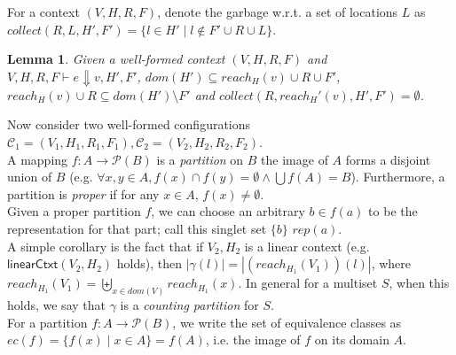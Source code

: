 \documentclass{easychair}
\newcommand{\na}[1]{\mathsf{linearCtxt}(#1)}
\newtheorem{lemma}[theorem]{Lemma}
\theoremstyle{definition}
\begin{document}
For a context $(V,H,R,F)$, denote the
garbage w.r.t. a set of locations $L$ 
as $collect(R,L,H',F') = \{l \in H' \mid l \notin F' \cup R \cup L\}$.
\begin{lemma}\label{itm:eager}
	Given a well-formed context $(V,H,R,F)$ and $V,H,R,F \vdash e \Downarrow v,H',F'$, 
	$dom(H') \subseteq reach_H(v) \cup R \cup F'$,
	$reach_H(v) \cup R \subseteq dom(H') \setminus F'$ and
	$collect(R,reach_H'(v),H',F') = \emptyset$.
\end{lemma}

Now consider two well-formed configurations $\mathcal{C}_1 = (V_1,H_1,R_1,F_1),
 \mathcal{C}_2 = (V_2,H_2,R_2,F_2)$.\\

A mapping $f : A \to \mathcal{P}(B)$ is a \emph{partition} on $B$ the image of 
$A$ forms a disjoint union of $B$ 
(e.g. $\forall x,y \in A, f(x) \cap f(y) = \emptyset \land \bigcup f(A) = B$). Furthermore,
a partition is \emph{proper} if for any $x \in A$, $f(x) \neq \emptyset$.\\
Given a proper partition $f$, we can choose an arbitrary 
$b \in f(a)$ to be the representation for that part; call this 
singlet set $\{b\}$ $rep(a)$.\\

A simple corollary is the fact that if $V_2,H_2$ is a linear context (e.g. $\na{V_2,H_2}$ holds), then
$|\gamma(l)| = |(reach_{H_1}(V_1))(l)|$, where $ reach_{H_1}(V_1) = \biguplus_{x \in dom(V)} reach_{H_1}(x)$. 
In general for a multiset $S$, when this holds, we say that 
$\gamma$ is a \emph{counting partition} for $S$.\\

For a partition $f : A \to \mathcal{P}(B)$, we write the set of equivalence classes
as $ec(f) = \{f(x) \mid x \in A\} = f(A)$, i.e. the image of $f$ on its domain $A$.\\
\end{document}
